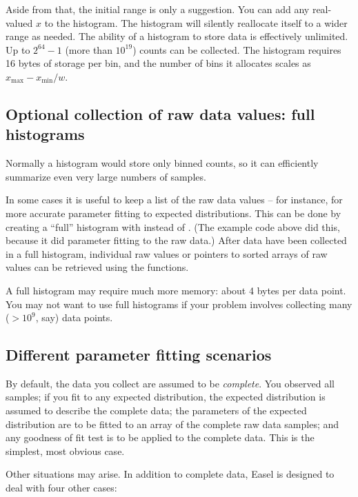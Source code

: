 Aside from that, the initial range is only a suggestion. You can add
any real-valued $x$ to the histogram. The histogram will silently
reallocate itself to a wider range as needed.  The ability of a
histogram to store data is effectively unlimited. Up to $2^{64}-1$
(more than $10^{19}$) counts can be collected. The histogram requires 16
bytes of storage per bin, and the number of bins it allocates scales
as $x_{\mbox{max}} - x_{\mbox{min}} / w$.

\subsection{Optional collection of raw data values: full histograms}

Normally a histogram would store only binned counts, so it can
efficiently summarize even very large numbers of samples.

In some cases it is useful to keep a list of the raw data values --
for instance, for more accurate parameter fitting to expected
distributions. This can be done by creating a ``full'' histogram with
 instead of
. (The example code above did this,
because it did parameter fitting to the raw data.) After data have
been collected in a full histogram, individual raw values or pointers
to sorted arrays of raw values can be retrieved using the
 functions.

A full histogram may require much more memory: about 4 bytes per data
point. You may not want to use full histograms if your problem
involves collecting many ($> 10^9$, say) data points.



\subsection{Different parameter fitting scenarios}

By default, the data you collect are assumed to be \emph{complete}.
You observed all samples; if you fit to any expected distribution, the
expected distribution is assumed to describe the complete data; the
parameters of the expected distribution are to be fitted to an array
of the complete raw data samples; and any goodness of fit test is to
be applied to the complete data. This is the simplest, most obvious
case.

Other situations may arise. In addition to complete data, Easel is
designed to deal with four other cases:

